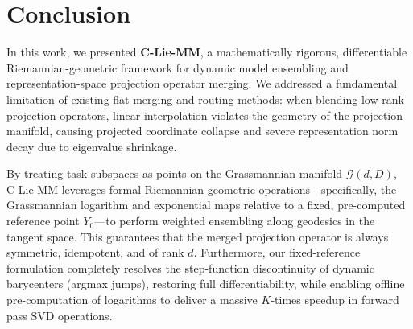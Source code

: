 \section{Conclusion}
\label{sec:conclusion}

In this work, we presented \textbf{C-Lie-MM}, a mathematically rigorous, differentiable Riemannian-geometric framework for dynamic model ensembling and representation-space projection operator merging. We addressed a fundamental limitation of existing flat merging and routing methods: when blending low-rank projection operators, linear interpolation violates the geometry of the projection manifold, causing projected coordinate collapse and severe representation norm decay due to eigenvalue shrinkage.

By treating task subspaces as points on the Grassmannian manifold $\mathcal{G}(d, D)$, C-Lie-MM leverages formal Riemannian-geometric operations—specifically, the Grassmannian logarithm and exponential maps relative to a fixed, pre-computed reference point $Y_0$—to perform weighted ensembling along geodesics in the tangent space. This guarantees that the merged projection operator is always symmetric, idempotent, and of rank $d$. Furthermore, our fixed-reference formulation completely resolves the step-function discontinuity of dynamic barycenters (argmax jumps), restoring full differentiability, while enabling offline pre-computation of logarithms to deliver a massive $K$-times speedup in forward pass SVD operations.

